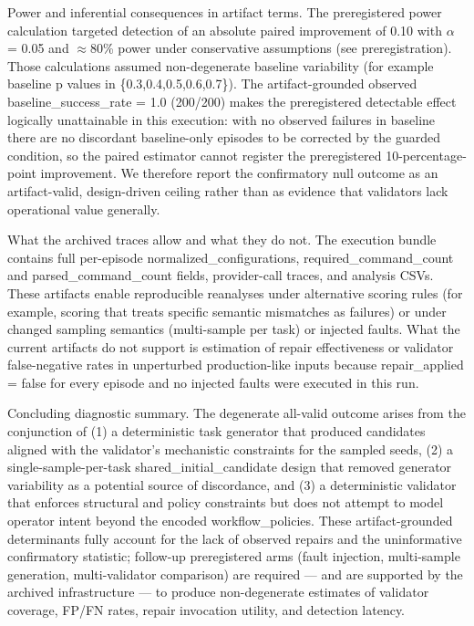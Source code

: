 \documentclass[conference]{IEEEtran}
\begin{document}
Power and inferential consequences in artifact terms. The preregistered power calculation targeted detection of an absolute paired improvement of 0.10 with \ensuremath{\alpha} = 0.05 and \ensuremath{\approx}80\% power under conservative assumptions (see preregistration). Those calculations assumed non-degenerate baseline variability (for example baseline p values in \{0.3,0.4,0.5,0.6,0.7\}). The artifact-grounded observed baseline\_success\_rate = 1.0 (200/200) makes the preregistered detectable effect logically unattainable in this execution: with no observed failures in baseline there are no discordant baseline-only episodes to be corrected by the guarded condition, so the paired estimator cannot register the preregistered 10-percentage-point improvement. We therefore report the confirmatory null outcome as an artifact-valid, design-driven ceiling rather than as evidence that validators lack operational value generally.

What the archived traces allow and what they do not. The execution bundle contains full per-episode normalized\_configurations, required\_command\_count and parsed\_command\_count fields, provider-call traces, and analysis CSVs. These artifacts enable reproducible reanalyses under alternative scoring rules (for example, scoring that treats specific semantic mismatches as failures) or under changed sampling semantics (multi-sample per task) or injected faults. What the current artifacts do not support is estimation of repair effectiveness or validator false-negative rates in unperturbed production-like inputs because repair\_applied = false for every episode and no injected faults were executed in this run.

Concluding diagnostic summary. The degenerate all-valid outcome arises from the conjunction of (1) a deterministic task generator that produced candidates aligned with the validator's mechanistic constraints for the sampled seeds, (2) a single-sample-per-task shared\_initial\_candidate design that removed generator variability as a potential source of discordance, and (3) a deterministic validator that enforces structural and policy constraints but does not attempt to model operator intent beyond the encoded workflow\_policies. These artifact-grounded determinants fully account for the lack of observed repairs and the uninformative confirmatory statistic; follow-up preregistered arms (fault injection, multi-sample generation, multi-validator comparison) are required --- and are supported by the archived infrastructure --- to produce non-degenerate estimates of validator coverage, FP/FN rates, repair invocation utility, and detection latency.
\end{document}
